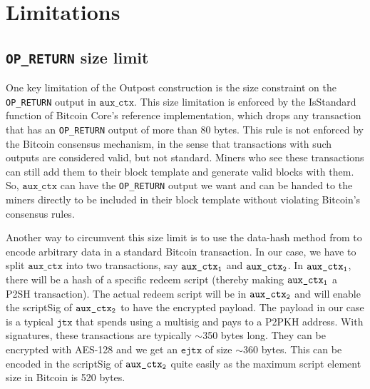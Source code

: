 \section{Limitations}
\subsection{\texttt{OP\_RETURN} size limit}
One key limitation of the Outpost construction is the size constraint on the \texttt{OP\_RETURN} output in $\texttt{aux\_ctx}$. This size limitation is enforced by the IsStandard function of Bitcoin Core's reference implementation, which drops any transaction that has an \texttt{OP\_RETURN} output of more than 80 bytes. This rule is not enforced by the Bitcoin consensus mechanism, in the sense that transactions with such outputs are considered valid, but not standard. Miners who see these transactions can still add them to their block template and generate valid blocks with them. So, $\texttt{aux\_ctx}$ can have the \texttt{OP\_RETURN} output we want and can be handed to the miners directly to be included in their block template without violating Bitcoin's consensus rules. 

Another way to circumvent this size limit is to use the data-hash method from \cite{sward2018data} to encode arbitrary data in a standard Bitcoin transaction. In our case, we have to split $\texttt{aux\_ctx}$ into two transactions, say $\texttt{aux\_ctx\textsubscript{1}}$ and $\texttt{aux\_ctx\textsubscript{2}}$. In $\texttt{aux\_ctx\textsubscript{1}}$, there will be a hash of a specific redeem script (thereby making $\texttt{aux\_ctx\textsubscript{1}}$ a P2SH transaction). The actual redeem script will be in $\texttt{aux\_ctx\textsubscript{2}}$ and will enable the scriptSig of $\texttt{aux\_ctx\textsubscript{2}}$ to have the encrypted payload. The payload in our case is a typical $\texttt{jtx}$ that spends using a multisig and pays to a P2PKH address. With signatures, these transactions are typically $\sim$350 bytes long. They can be encrypted with AES-128 and we get an $\texttt{ejtx}$ of size $\sim$360 bytes. This can be encoded in the scriptSig of $\texttt{aux\_ctx\textsubscript{2}}$ quite easily as the maximum script element size in Bitcoin is 520 bytes.

